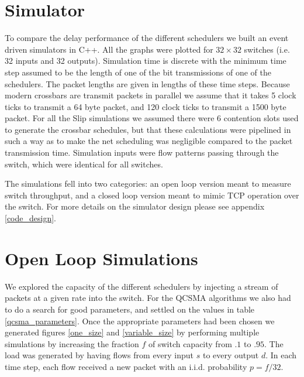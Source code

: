 \documentclass{IEEEtran}%
\begin{document}
\section{Simulator}

To compare the delay performance of the different schedulers we built an event driven simulators in C++.  All the graphs were plotted for $32 \times 32$ switches (i.e. 32 inputs and 32 outputs).  Simulation time is discrete with the minimum time step assumed to be the length of one of the bit transmissions of one of the schedulers.   The packet lengths are given in lengths of these time steps.  Because modern crossbars are transmit packets in parallel we assume that it takes 5 clock ticks to transmit a 64 byte packet, and 120 clock ticks to transmit a 1500 byte packet.  For all the Slip simulations we assumed there were $6$ contention slots used to generate the crossbar schedules, but that these calculations were pipelined in such a way as to make the net scheduling was negligible compared to the packet transmission time.  Simulation inputs were flow patterns passing through the switch, which were identical for all switches. %

 The simulations fell into two categories: an open loop version meant to measure switch throughput, and a closed loop version meant to mimic TCP operation over the switch.  For more details on the simulator design please see appendix \ref{code_design}.%
 
\section{Open Loop Simulations} \label{open}

We explored the capacity of the different schedulers by injecting a stream of packets at a given rate into the switch.  For the QCSMA algorithms we also had to do a search for good parameters, and settled on the values in table \ref{qcsma_parameters}.  Once the appropriate parameters had been chosen we generated figures \ref{one_size} and \ref{variable_size} by performing multiple simulations by increasing the fraction $f$ of switch capacity from $.1$ to $.95$.  The load was generated by having flows from every input $s$ to every output $d$.  In each time step, each flow received a new packet with an i.i.d. probability $p=f/32$.
\end{document}
